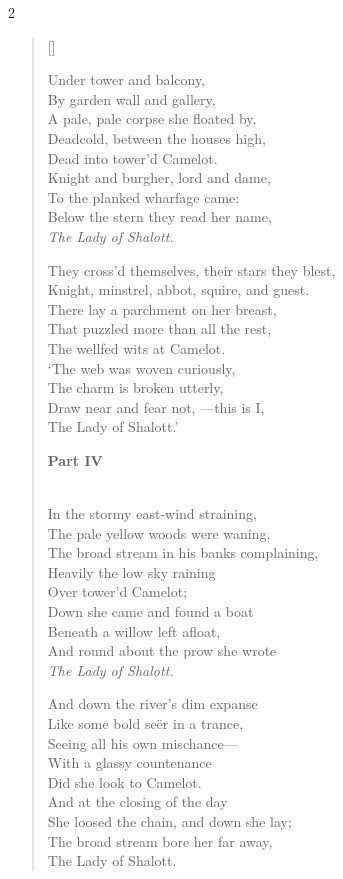 \begin{paracol}{2}
\begin{verse}[\versewidth]
\begin{patverse}
Under tower and balcony,\\
By garden wall and gallery,\\
A pale, pale corpse she floated by,\\
Deadcold, between the houses high,\\
Dead into tower'd Camelot.\\
Knight and burgher, lord and dame,\\
To the planked wharfage came:\\
Below the stern they read her name,\\
\emph{The Lady of Shalott.}
\end{patverse}

\begin{patverse}
They cross'd themselves, their stars they blest,\\
Knight, minstrel, abbot, squire, and guest.\\
There lay a parchment on her breast,\\
That puzzled more than all the rest,\\
The wellfed wits at Camelot.\\
`The web was woven curiously,\\
The charm is broken utterly,\\
Draw near and fear not, —this is I,\\
The Lady of Shalott.' \end{patverse} \switchcolumn

\textbf{Part IV} 
\begin{patverse}
\phantom{.}\\
In the stormy east-wind straining,\\
The pale yellow woods were waning,\\
The broad stream in his banks complaining,\\
Heavily the low sky raining\\
Over tower'd Camelot;\\
Down she came and found a boat\\
Beneath a willow left afloat,\\
And round about the prow she wrote\\
\emph{The Lady of Shalott.}
\end{patverse}

\begin{patverse}
And down the river's dim expanse\\
Like some bold seër in a trance,\\
Seeing all his own mischance—\\
With a glassy countenance\\
Did she look to Camelot.\\
And at the closing of the day\\
She loosed the chain, and down she lay;\\
The broad stream bore her far away,\\
The Lady of Shalott.
\end{patverse}


\end{verse}
\end{paracol}
